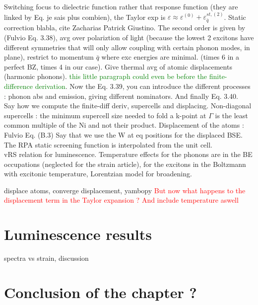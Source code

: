 Switching focus to dielectric function rather that response function (they are linked by Eq. je sais plus combien), the Taylor exp is $\varepsilon \approx \varepsilon^{(0)} + \varepsilon^{st,(2)}_{\bar{q}}$. Static correction blabla, cite Zacharias Patrick Giustino. The second order is given by (Fulvio Eq. 3.38), avg over polariztion of light (because the lowest 2 excitons have different symmetries that will only allow coupling with certain phonon modes, in plane), restrict to momentum $\bar{q}$ where exc energies are minimal. (times 6 in a perfect BZ, times 4 in our case). Give thermal avg of atomic displacements (harmonic phonons). \textcolor{green}{this little paragraph could even be before the finite-difference derivation}. Now the Eq. 3.39, you can introduce the different processes : phonon abs and emission, giving different nominators. And finally Eq. 3.40. \\
Say how we compute the finite-diff deriv, supercells and displacing. Non-diagonal supercells \cite{Monserrat} : the minimum supercell size needed to fold a k-point at $\Gamma$ is the least common multiple of the Ni and not their product. Displacement of the atoms : Fulvio Eq. (B.3) 
Say that we use the W at eq positions for the displaced BSE. The \acrshort{RPA} static screening function is  interpolated from the unit cell. \\
vRS relation for luminescence. Temperature effects for the phonons are in the BE occupations (neglected for the strain article), for the excitons in the Boltzmann with excitonic temperature, Lorentzian model for broadening.



displace atoms, converge displacement, yambopy
\textcolor{red}{But now what happens to the displacement term in the Taylor expansion ? And include temperature aswell}

%
\section{Luminescence results}
spectra vs strain, discussion

%
\section*{Conclusion of the chapter ?}